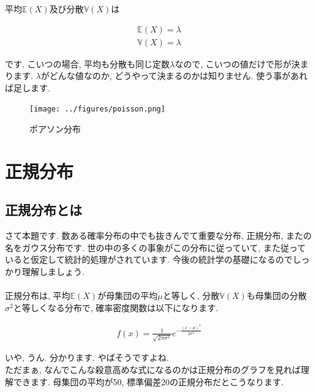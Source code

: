 \documentclass[11pt,a4paper,uplatex]{ujreport} 	%
\begin{document}
平均$\mathbb{E}(X)$及び分散$\mathbb{V}(X)$は

\begin{align}
\mathbb{E}(X) = \lambda\\
\mathbb{V}(X) = \lambda
\end{align}

です. こいつの場合, 平均も分散も同じ定数$\lambda$なので, こいつの値だけで形が決まります. $\lambda$がどんな値なのか, どうやって決まるのかは知りません. 使う事があれば足します.\\

\begin{figure}[H]
\label{im:poisson}
  \centering
  \texttt{[image: ../figures/poisson.png]}
  \caption{ポアソン分布}
\end{figure}

\section{正規分布}
\subsection{正規分布とは}
さて本題です. 数ある確率分布の中でも抜きんでて重要な分布, 正規分布, またの名をガウス分布です. 世の中の多くの事象がこの分布に従っていて, また従っていると仮定して統計的処理がされています. 今後の統計学の基礎になるのでしっかり理解しましょう.\\
\\

正規分布は, 平均$\mathbb{E}(X)$が母集団の平均$μ$と等しく, 分散$\mathbb{V}(X)$も母集団の分散$\sigma ^2$と等しくなる分布で, 確率密度関数は以下になります.

\begin{align}
\label{eq:normal}
f(x) = \frac{1}{\sqrt{2\pi\sigma^2}}e^{-\frac{(x-\mu)^2}{2\sigma^2}}
\end{align}

いや, うん. 分かります. やばそうですよね. \\

ただまぁ, なんでこんな殺意高めな式になるのかは正規分布のグラフを見れば理解できます. 母集団の平均が50, 標準偏差20の正規分布だとこうなります.
\end{document}
